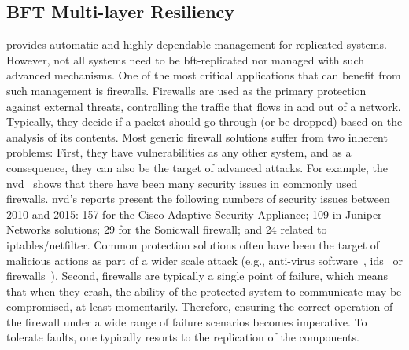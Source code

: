 \subsection{BFT Multi-layer Resiliency} 
\system provides automatic and highly dependable management for replicated systems. 
However, not all systems need to be \gls{bft}-replicated nor managed with such advanced mechanisms. 
One of the most critical applications that can benefit from such management is firewalls.
Firewalls are used as the primary protection against external threats, controlling the traffic that flows in and out of a network. 
Typically, they decide if a packet should go through (or be dropped) based on the analysis of its contents. 
Most generic firewall solutions suffer from two inherent problems: 
First, they have vulnerabilities as any other system, and as a consequence, they can also be the target of advanced attacks. 
For example, the \gls{nvd}~\cite{nvd} shows that there have been many security issues in commonly used firewalls. 
\gls{nvd}'s reports present the following numbers of security issues between 2010 and 2015: 157 for the Cisco Adaptive Security Appliance; 109 in Juniper Networks solutions; 29 for the Sonicwall firewall; and 24 related to iptables/netfilter. 
Common protection solutions often have been the target of malicious actions as part of a wider scale attack (e.g., anti-virus software~\cite{Chauhan:2011}, \gls{ids}~\cite{Anderson:2001} or firewalls~\cite{Kamara:2003,Surisetty:2010,cisco1,cisco2}).
Second, firewalls are typically a single point of failure, which means that when they crash, the ability of the protected system to communicate may be compromised, at least momentarily.
Therefore, ensuring the correct operation of the firewall under a wide range of failure scenarios becomes imperative.
To tolerate faults, one typically resorts to the replication of the components.


